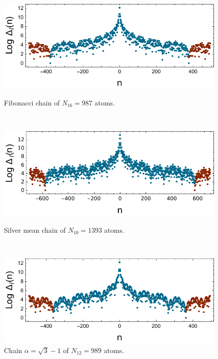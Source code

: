 \documentclass[a4paper]{jpconf}
\begin{document}
\begin{figure}[htp]
	\centering
	\begin{minipage}{0.3\textwidth}
		\centering
		\includegraphics[width=1.\textwidth]{loggapwidth_Fibonacci_l_16.pdf}
		\caption{\small{Fibonacci chain of $N_{16} = 987$ atoms.}}
		\label{fig:width1}
	\end{minipage}~~
	\begin{minipage}{0.3\textwidth}
		\centering
		\includegraphics[width=1.\textwidth]{loggapwidth_Silver_l_10.pdf}
		\caption{\small{Silver mean chain of $N_{10} = 1393$ atoms.}}
		\label{fig:width2}
	\end{minipage}~~
	\begin{minipage}{0.3\textwidth}
		\centering
		\includegraphics[width=1.\textwidth]{loggapwidth_sqrt3_l_12.pdf}
		\caption{\small{Chain $\alpha = \sqrt{3}-1$ of $N_{12} = 989$ atoms.}}
		\label{fig:width3}
	\end{minipage}
\end{figure}
\end{document}
